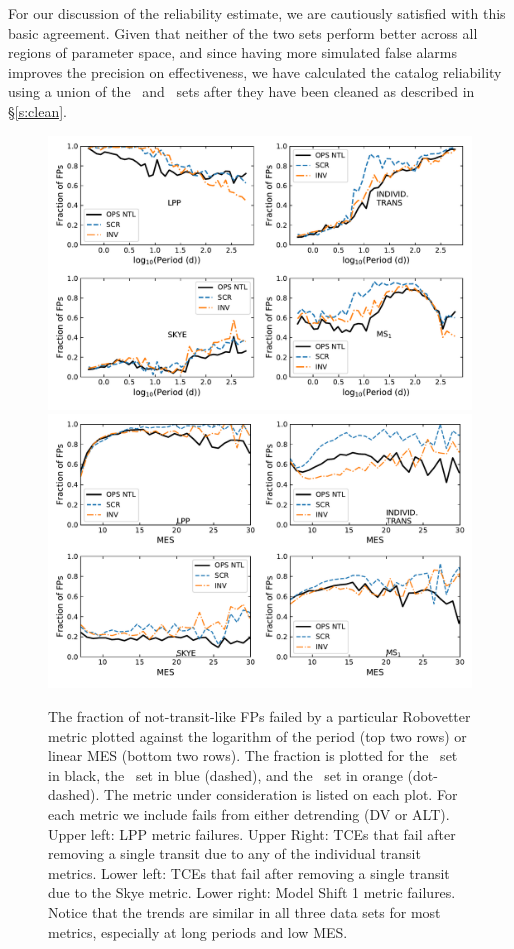 For our discussion of the reliability estimate, we are cautiously satisfied with this basic agreement. Given that neither of the two sets perform better across all regions of parameter space, and since having more simulated false alarms improves the precision on effectiveness,  we have calculated the catalog reliability using a union of the \scrtce\ and \invtce\ sets after they have been cleaned as described in \S\ref{s:clean}.  



\begin{figure}[hp]
    \centering
    \includegraphics[width=0.85\linewidth]{f6-top.pdf}
    \includegraphics[width=0.85\linewidth]{f6-bottom.pdf}
    \caption{The fraction of not-transit-like FPs failed by a particular Robovetter metric plotted against the logarithm of the period (top two rows) or linear MES (bottom two rows).  The fraction is plotted for the \opstce\ set in black, the \scrtce\ set in blue (dashed), and the \invtce\ set in orange (dot-dashed). The metric under consideration is listed on each plot.  For each metric we include fails from either detrending (DV or ALT). Upper left: LPP metric failures. Upper Right: TCEs that fail after removing a single transit due to any of the individual transit metrics.  Lower left: TCEs that fail after removing a single transit due to the Skye metric. Lower right: Model Shift 1 metric failures. Notice that the trends are similar in all three data sets for most metrics, especially at long periods and low MES.}
    \label{f:fractionFailMetric}
\end{figure}


